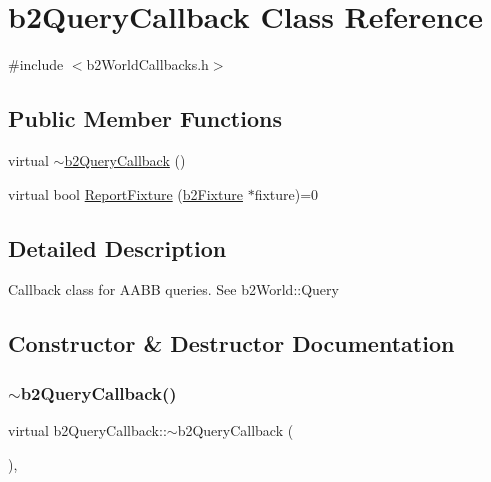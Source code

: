 \hypertarget{classb2_query_callback}{}\section{b2\+Query\+Callback Class Reference}
\label{classb2_query_callback}


{\ttfamily \#include $<$b2\+World\+Callbacks.\+h$>$}

\subsection*{Public Member Functions}
\begin{DoxyCompactItemize}
\item 
virtual \mbox{\hyperlink{classb2_query_callback_a8749b2ff1ab37e3d47e2b162749dbd52}{$\sim$b2\+Query\+Callback}} ()
\item 
virtual bool \mbox{\hyperlink{classb2_query_callback_a187dd04dd0f5164fb05c2ce2cbfd9ee5}{Report\+Fixture}} (\mbox{\hyperlink{classb2_fixture}{b2\+Fixture}} $\ast$fixture)=0
\end{DoxyCompactItemize}


\subsection{Detailed Description}
Callback class for A\+A\+BB queries. See b2\+World\+::\+Query 

\subsection{Constructor \& Destructor Documentation}
\mbox{\label{classb2_query_callback_a8749b2ff1ab37e3d47e2b162749dbd52}} 
\subsubsection{\texorpdfstring{$\sim$b2QueryCallback()}{~b2QueryCallback()}}
{\footnotesize\ttfamily virtual b2\+Query\+Callback\+::$\sim$b2\+Query\+Callback (\begin{DoxyParamCaption}{ }\end{DoxyParamCaption})\hspace{0.3cm}{\ttfamily [inline]}, {\ttfamily [virtual]}}



